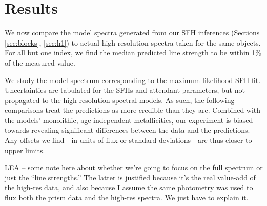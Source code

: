 \documentclass[a4paper,fleqn,usenatbib]{mnras}
\newcommand{\bfb}{\color{myblue}}
\begin{document}
\section{Results}
\label{sec:results}

We now compare the model spectra generated from our SFH inferences 
(Sections \ref{sec:blocks}, \ref{sec:h1}) to actual high resolution spectra taken for
the same objects. For all but one index, we find the median predicted line strength 
to be within 1\% of the measured value. 

We study the model spectrum corresponding to
the maximum-likelihood SFH fit. Uncertainties are tabulated for the SFHs and attendant 
parameters, but not propagated to the high resolution spectral models. As such,
the following comparisons treat the predictions as more credible than they are. Combined with the
models' monolithic, age-independent metallicities, our experiment is biased towards 
revealing significant differences between the data and the predictions. Any offsets we find---in units
of flux or standard deviations---are thus closer to upper limits. %

{\bfb LEA -- some note here about whether we're going to focus on the full spectrum or just the ``line
strengths.'' The latter is justified because it's the real value-add of the high-res data, and also because
I assume the same photometry was used to flux both the prism data and the high-res spectra. We
just have to explain it.}


\end{document}

